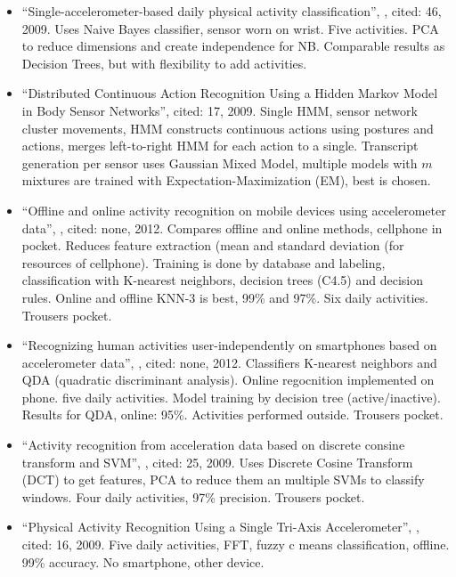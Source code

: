 \begin{itemize}
  \item ``Single-accelerometer-based daily physical activity classification'', \cite{long2009single}, cited: 46, 2009. Uses Naive Bayes classifier, sensor worn on wrist. Five activities. PCA to reduce dimensions and create independence for NB. Comparable results as Decision Trees, but with flexibility to add activities.
  \item ``Distributed Continuous Action Recognition Using a Hidden Markov Model in Body Sensor Networks'', \cite{guenterberg2009distributed} cited: 17, 2009. Single HMM, sensor network cluster movements, HMM constructs continuous actions using postures and actions, merges left-to-right HMM for each action to a single. Transcript generation per sensor uses Gaussian Mixed Model, multiple models with $m$ mixtures are trained with Expectation-Maximization (EM), best is chosen.
  \item ``Offline and online activity recognition on mobile devices using accelerometer data'', \cite{duque2012offline}, cited: none, 2012. Compares offline and online methods, cellphone in pocket. Reduces feature extraction (mean and standard deviation (for resources of cellphone). Training is done by database and labeling, classification with K-nearest neighbors, decision trees (C4.5) and decision rules. Online and offline KNN-3 is best, 99\% and 97\%. Six daily activities. Trousers pocket.
  \item ``Recognizing human activities user-independently on smartphones based on accelerometer data'', \cite{siirtola2012recognizing}, cited: none, 2012. Classifiers K-nearest neighbors and QDA (quadratic discriminant analysis). Online regocnition implemented on phone. five daily activities. Model training by decision tree (active/inactive). Results for QDA, online: 95\%. Activities performed outside. Trousers pocket.
  \item ``Activity recognition from acceleration data based on discrete consine transform and SVM'', \cite{he2009activity}, cited: 25, 2009. Uses Discrete Cosine Transform (DCT) to get features, PCA to reduce them an multiple SVMs to classify windows. Four daily activities, 97\% precision. Trousers pocket.
  \item ``Physical Activity Recognition Using a Single Tri-Axis Accelerometer'', \cite{lee2178physical}, cited: 16, 2009. Five daily activities, FFT, fuzzy c means classification, offline. 99\% accuracy. No smartphone, other device.
\end{itemize}